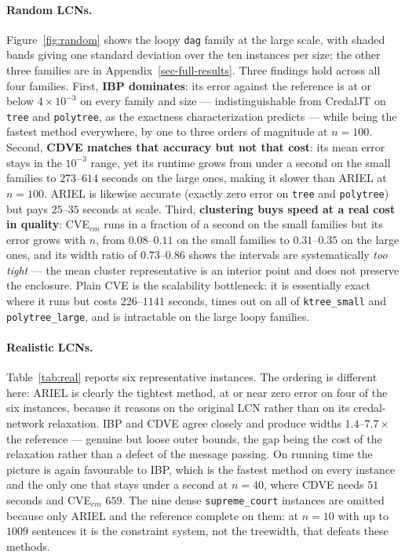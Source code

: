 \documentclass{article}
\begin{document}
\paragraph{Random LCNs.}
Figure~\ref{fig:random} shows the loopy \texttt{dag} family at the large scale,
with shaded bands giving one standard deviation over the ten instances per size;
the other three families are in Appendix~\ref{sec-full-results}. Three findings
hold across all four families. First, \textbf{IBP dominates}: its error against the reference
is at or below $4 \times 10^{-3}$ on every family and size --- indistinguishable
from CredalJT on \texttt{tree} and \texttt{polytree}, as the exactness
characterization predicts --- while being the fastest method everywhere, by one
to three orders of magnitude at $n{=}100$. Second, \textbf{CDVE matches that
accuracy but not that cost}: its mean error stays in the $10^{-3}$ range, yet its
runtime grows from under a second on the small families to $273$--$614$ seconds
on the large ones, making it slower than ARIEL at $n{=}100$. ARIEL is likewise
accurate (exactly zero error on \texttt{tree} and \texttt{polytree}) but pays
$25$--$35$ seconds at scale. Third, \textbf{clustering buys speed at a real cost
in quality}: CVE$_{cm}$ runs in a fraction of a second on the small families but
its error grows with $n$, from $0.08$--$0.11$ on the small families to
$0.31$--$0.35$ on the large ones, and its width ratio of $0.73$--$0.86$ shows the
intervals are systematically \emph{too tight} --- the mean cluster representative
is an interior point and does not preserve the enclosure. Plain CVE is the
scalability bottleneck: it is essentially exact where it runs but costs
$226$--$1141$ seconds, times out on all of \texttt{ktree\_small} and
\texttt{polytree\_large}, and is intractable on the large loopy families.

\paragraph{Realistic LCNs.}
Table~\ref{tab:real} reports six representative instances. The ordering is
different here: ARIEL is clearly the tightest method, at or near zero error on
four of the six instances, because it reasons on the original LCN rather than on
its credal-network relaxation. IBP and CDVE agree closely and produce widths $1.4$--$7.7\times$ the reference ---
genuine but loose outer bounds, the gap being the cost of the relaxation rather
than a defect of the message passing. On running time the picture is again favourable to IBP, which is the
fastest method on every instance and the only one that stays under a second at
$n{=}40$, where CDVE needs $51$ seconds and CVE$_{cm}$ $659$. The nine dense \texttt{supreme\_court} instances are omitted because only
ARIEL and the reference complete on them: at $n{=}10$ with up to $1009$ sentences
it is the constraint system, not the treewidth, that defeats these methods.
\end{document}
